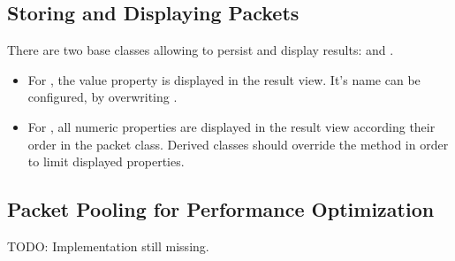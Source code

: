 \subsection*{Storing and Displaying Packets}
There are two base classes allowing to persist and display results:  and .

\begin{itemize}
  \item For , the value property is displayed in the result view. It's name can be configured, by overwriting .
  \item For , all numeric properties are displayed in the result view according their order in the packet class.
	Derived classes should override the method  in order to limit displayed properties.
\end{itemize}


\subsection*{Packet Pooling for Performance Optimization}
TODO: Implementation still missing.